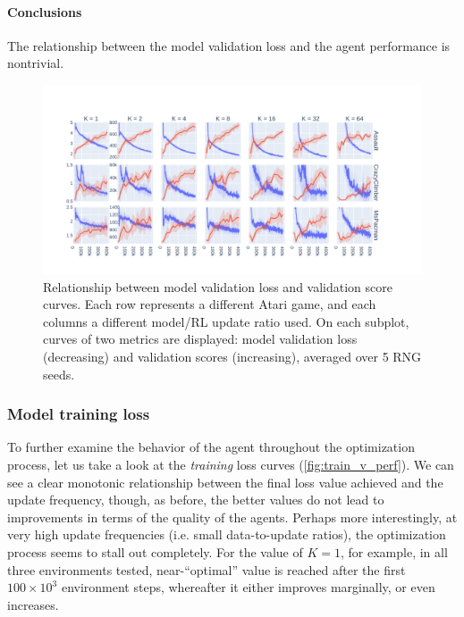 \documentclass[en]{pracamgr}
\newcommand{\figurewidth}{\linewidth}
\newcommand{\figureheight}{0.8\paperheight}
\begin{document}
\paragraph{Conclusions} The relationship between the model validation loss and the agent performance is nontrivial.

\begin{figure}
  \centering
  \includegraphics[width=\figurewidth,height=\figureheight,keepaspectratio]{assets/val_loss_v_perf.pdf}
  \caption{Relationship between model validation loss and validation score curves. Each row represents a different Atari game, and each columns a different model/RL update ratio used. On each subplot, curves of two metrics are displayed: model validation loss (decreasing) and validation scores (increasing), averaged over 5 RNG seeds.}
  \label{fig:val_v_perf}
\end{figure}

\subsubsection{Model training loss}

To further examine the behavior of the agent throughout the optimization process, let us take a look at the \emph{training} loss curves (\autoref{fig:train_v_perf}). We can see a clear monotonic relationship between the final loss value achieved and the update frequency, though, as before, the better values do not lead to improvements in terms of the quality of the agents. Perhaps more interestingly, at very high update frequencies (i.e. small data-to-update ratios), the optimization process seems to stall out completely. For the value of $K = 1$, for example, in all three environments tested, near-``optimal'' value is reached after the first $100 \times 10^3$ environment steps, whereafter it either improves marginally, or even increases.
\end{document}
